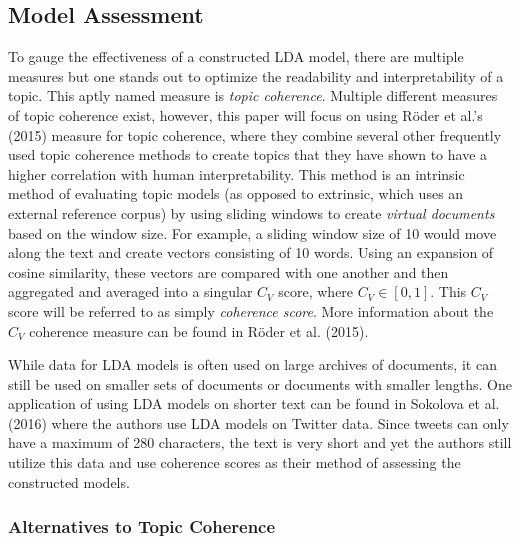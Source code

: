 \documentclass[a4paper, 12pt, twoside]{article}
\numberwithin{equation}{section} %
\begin{document}
\subsection{Model Assessment}

To gauge the effectiveness of a constructed LDA model, there are multiple measures but one stands out to optimize the readability and interpretability of a topic. This aptly named measure is \textit{topic coherence}. Multiple different measures of topic coherence exist, however, this paper will focus on using Röder et al.'s (2015) measure for topic coherence, where they combine several other frequently used topic coherence methods to create topics that they have shown to have a higher correlation with human interpretability. This method is an intrinsic method of evaluating topic models (as opposed to extrinsic, which uses an external reference corpus) by using sliding windows to create \textit{virtual documents} based on the window size. For example, a sliding window size of 10 would move along the text and create vectors consisting of 10 words. Using an expansion of cosine similarity, these vectors are compared with one another and then aggregated and averaged into a singular $C_V$ score, where $C_V \in [0, 1]$. This $C_V$ score will be referred to as simply \textit{coherence score}. More information about the $C_V$ coherence measure can be found in Röder et al. (2015).

While data for LDA models is often used on large archives of documents, it can still be used on smaller sets of documents or documents with smaller lengths. One application of using LDA models on shorter text can be found in Sokolova et al. (2016) where the authors use LDA models on Twitter data. Since tweets can only have a maximum of 280 characters, the text is very short and yet the authors still utilize this data and use coherence scores as their method of assessing the constructed models. 

\subsubsection{Alternatives to Topic Coherence}
\end{document}
